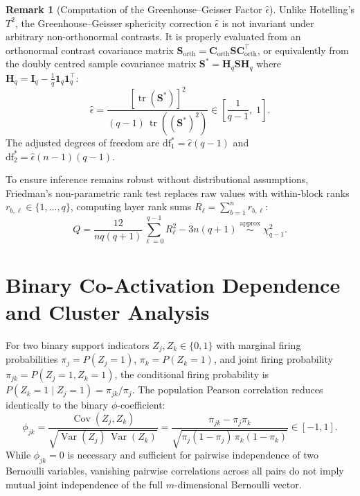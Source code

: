 \documentclass[12pt, a4paper, oneside]{report}
\theoremstyle{definition}
\newtheorem{remark}{Remark}[chapter]
\newcommand{\vect}[1]{\mathbf{#1}}
\newcommand{\mat}[1]{\mathbf{#1}}
\newcommand{\tr}{\operatorname{tr}}
\newcommand{\Var}{\operatorname{Var}}
\newcommand{\Cov}{\operatorname{Cov}}
\begin{document}
\begin{remark}[Computation of the Greenhouse--Geisser Factor $\hat{\epsilon}$]
Unlike Hotelling's $T^2$, the Greenhouse--Geisser sphericity correction $\hat{\epsilon}$ is not invariant under arbitrary non-orthonormal contrasts. It is properly evaluated from an orthonormal contrast covariance matrix $\mat{S}_{\text{orth}} = \mat{C}_{\text{orth}}\mat{S}\mat{C}_{\text{orth}}^\top$, or equivalently from the doubly centred sample covariance matrix $\mat{S}^* = \mat{H}_q \mat{S} \mat{H}_q$ where $\mat{H}_q = \mat{I}_q - \frac{1}{q}\vect{1}_q\vect{1}_q^\top$:
\begin{equation}
    \hat{\epsilon} = \frac{[\tr(\mat{S}^*)]^2}{(q - 1)\,\tr\!\left((\mat{S}^*)^2\right)} \in \left[\frac{1}{q - 1},\; 1\right].
    \label{eq:gg_epsilon}
\end{equation}
The adjusted degrees of freedom are $\mathrm{df}_1^* = \hat{\epsilon}(q - 1)$ and $\mathrm{df}_2^* = \hat{\epsilon}(n - 1)(q - 1)$.
\end{remark}

To ensure inference remains robust without distributional assumptions, Friedman's non-parametric rank test replaces raw values with within-block ranks $r_{b,\ell} \in \{1, \dots, q\}$, computing layer rank sums $R_\ell = \sum_{b=1}^n r_{b,\ell}$:
\begin{equation}
    Q = \frac{12}{n q (q + 1)} \sum_{\ell=0}^{q-1} R_\ell^2 - 3 n (q + 1) \;\stackrel{\text{approx}}{\sim}\; \chi^2_{q-1}.
    \label{eq:friedman}
\end{equation}

\section{Binary Co-Activation Dependence and Cluster Analysis}

For two binary support indicators $Z_j, Z_k \in \{0, 1\}$ with marginal firing probabilities $\pi_j = P(Z_j = 1)$, $\pi_k = P(Z_k = 1)$, and joint firing probability $\pi_{jk} = P(Z_j = 1, Z_k = 1)$, the conditional firing probability is $P(Z_k = 1 \mid Z_j = 1) = \pi_{jk} / \pi_j$. The population Pearson correlation reduces identically to the binary $\phi$-coefficient:
\begin{equation}
    \phi_{jk} = \frac{\Cov(Z_j, Z_k)}{\sqrt{\Var(Z_j)\,\Var(Z_k)}} = \frac{\pi_{jk} - \pi_j \pi_k}{\sqrt{\pi_j (1 - \pi_j)\,\pi_k (1 - \pi_k)}} \in [-1, 1].
    \label{eq:phi_coeff}
\end{equation}
While $\phi_{jk} = 0$ is necessary and sufficient for pairwise independence of two Bernoulli variables, vanishing pairwise correlations across all pairs do not imply mutual joint independence of the full $m$-dimensional Bernoulli vector.
\end{document}
